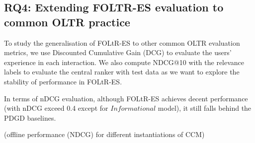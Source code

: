 
%
%


\subsection{RQ4: Extending FOLTR-ES evaluation to common OLTR practice}


To study the generalisation of FOLtR-ES to other common OLTR evaluation metrics, we use Discounted Cumulative Gain (DCG) to evaluate the users' experience in each interaction. We also compute NDCG@10 with the relevance labels to evaluate the central ranker with test data as we want to explore the stability of  performance in FOLtR-ES.

In terms of nDCG evaluation, although FOLtR-ES achieves decent performance (with nDCG exceed 0.4 except for $Informational$ model), it still falls behind the PDGD baselines.



(offline performance (NDCG) for different instantiations of CCM)